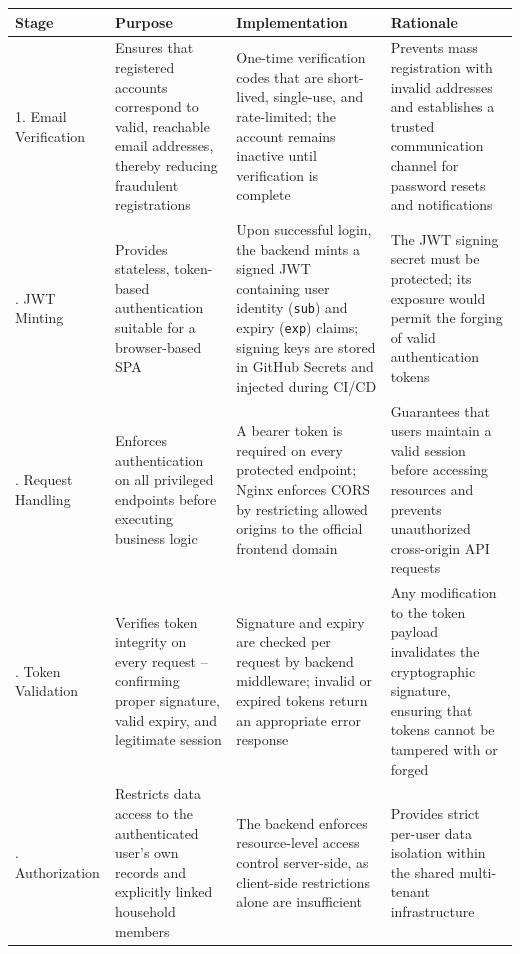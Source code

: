 \documentclass[conference]{IEEEtran}
\begin{document}
\clearpage
\onecolumn
\appendix

\begin{center}
\label{tab:security}
\begin{tabular}{p{3cm}p{4.5cm}p{4.5cm}p{4.5cm}}
\toprule
\textbf{Stage} & \textbf{Purpose} & \textbf{Implementation} & \textbf{Rationale} \\
\midrule
1. Email Verification &
Ensures that registered accounts correspond to valid, reachable email addresses, thereby reducing fraudulent registrations &
One-time verification codes that are short-lived, single-use, and rate-limited; the account remains inactive until verification is complete &
Prevents mass registration with invalid addresses and establishes a trusted communication channel for password resets and notifications \\
\addlinespace
2. JWT Minting &
Provides stateless, token-based authentication suitable for a browser-based SPA &
Upon successful login, the backend mints a signed JWT containing user identity (\texttt{sub}) and expiry (\texttt{exp}) claims; signing keys are stored in GitHub Secrets and injected during CI/CD &
The JWT signing secret must be protected; its exposure would permit the forging of valid authentication tokens \\
\addlinespace
3. Request Handling &
Enforces authentication on all privileged endpoints before executing business logic &
A bearer token is required on every protected endpoint; Nginx enforces CORS by restricting allowed origins to the official frontend domain &
Guarantees that users maintain a valid session before accessing resources and prevents unauthorized cross-origin API requests \\
\addlinespace
4. Token Validation &
Verifies token integrity on every request -- confirming proper signature, valid expiry, and legitimate session &
Signature and expiry are checked per request by backend middleware; invalid or expired tokens return an appropriate error response &
Any modification to the token payload invalidates the cryptographic signature, ensuring that tokens cannot be tampered with or forged \\
\addlinespace
5. Authorization &
Restricts data access to the authenticated user's own records and explicitly linked household members &
The backend enforces resource-level access control server-side, as client-side restrictions alone are insufficient &
Provides strict per-user data isolation within the shared multi-tenant infrastructure \\
\bottomrule
\end{tabular}
\end{center}
\end{document}
